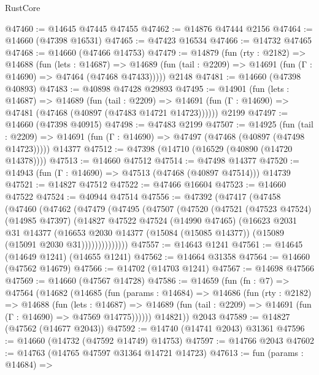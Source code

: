 \begin{lexlean}{RustCore}
\begin{coremodule}
@47460 := @14645 @47445 @47455
@47462 := @14876 @47444 @2156
@47464 := @14660 (@47398 @16531)
@47465 := @47423 @16534
@47466 := @14732 @47465
@47468 := @14660 (@47466 @14753)
@47479 := @14879
    (fun (rty : @2182) =>
    @14688
      (fun (lets : @14687) =>
      @14689 (fun (tail : @2209) => @14691 (fun (Γ : @14690) => @47464 (@47468 @47433)))))
    @2148
@47481 := @14660 (@47398 @40893)
@47483 := @40898 @47428 @29893
@47495 := @14901
    (fun (lets : @14687) =>
    @14689
      (fun (tail : @2209) =>
      @14691 (fun (Γ : @14690) => @47481 (@47468 (@40897 (@47483 @14721 @14723))))))
    @2199
@47497 := @14660 (@47398 @40915)
@47498 := @47483 @2199
@47507 := @14925
    (fun (tail : @2209) => @14691 (fun (Γ : @14690) => @47497 (@47468 (@40897 (@47498 @14723)))))
    @14377
@47512 := @47398 (@14710 (@16529 (@40890 (@14720 @14378))))
@47513 := @14660 @47512
@47514 := @47498 @14377
@47520 := @14943 (fun (Γ : @14690) => @47513 (@47468 (@40897 @47514))) @14739
@47521 := @14827 @47512
@47522 := @47466 @16604
@47523 := @14660 @47522
@47524 := @40944 @47514
@47556 := @47392
    (@47417
      (@47458
        (@47460
          (@47462
            (@47479
              (@47495
                (@47507
                  (@47520
                    (@47521
                      (@47523 @47524)
                      (@14985 @47397)
                      (@14827
                        @47522
                        @47524
                        (@14990 @47465)
                        (@16623
                          @2031
                          @31
                          @14377
                          (@16653
                            @2030
                            @14377
                            (@15084 (@15085 @14377))
                            (@15089 (@15091 @2030 @31))))))))))))))
@47557 := @14643 @1241
@47561 := @14645 (@14649 @1241) (@14655 @1241)
@47562 := @14664 @31358
@47564 := @14660 (@47562 @14679)
@47566 := @14702 (@14703 @1241)
@47567 := @14698 @47566
@47569 := @14660 (@47567 @14728)
@47586 := @14659
    (fun (fn : @7) =>
    @47564
      (@14682
        (@14685
          (fun (params : @14684) =>
          @14686
            (fun (rty : @2182) =>
            @14688
              (fun (lets : @14687) =>
              @14689 (fun (tail : @2209) => @14691 (fun (Γ : @14690) => @47569 @14775))))))
        @14821))
    @2043
@47589 := @14827 (@47562 (@14677 @2043))
@47592 := @14740 (@14741 @2043) @31361
@47596 := @14660 (@14732 (@47592 @14749) @14753)
@47597 := @14766 @2043
@47602 := @14763 (@14765 @47597 @31364 @14721 @14723)
@47613 := fun (params : @14684) =>

\end{coremodule}
\end{lexlean}
